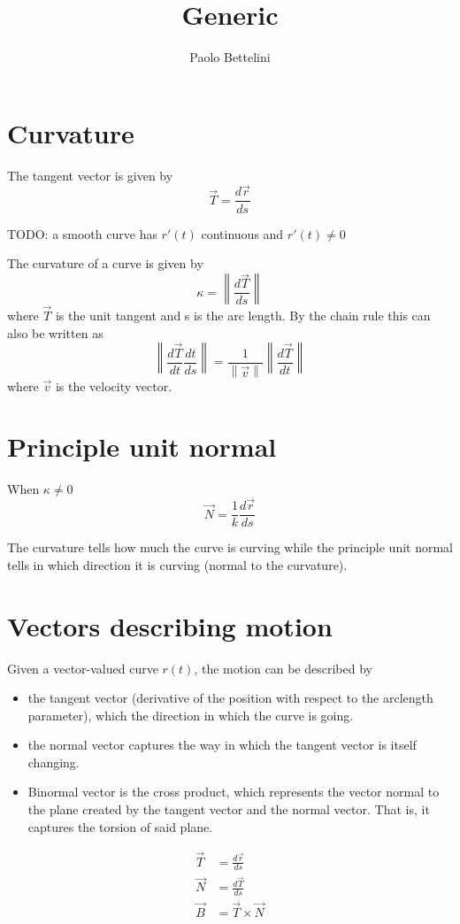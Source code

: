\documentclass[a4paper]{article}
\title{Generic}
\author{Paolo Bettelini}
\date{}
\begin{document}
\section{Curvature}

The tangent vector is given by
\[
    \vec{T} = \frac{d\vec{r}}{ds}
\]

TODO: a smooth curve has \(r'(t)\) continuous and \(r'(t) \neq 0\)

\newcommand\norm[1]{\left\lVert#1\right\rVert}
The curvature of a curve is given by
\[
    \kappa = \norm{\frac{d\vec{T}}{ds}}
\]
where \(\vec{T}\) is the unit tangent and s is the arc length.
By the chain rule this can also be written as
\[
    \norm{\frac{d\vec{T}}{dt}\frac{dt}{ds}} = \frac{1}{\norm{\vec{v}}}\norm{\frac{d\vec{T}}{dt}}
\]
where \(\vec{v}\) is the velocity vector.


\section{Principle unit normal}

When \(\kappa \neq 0\)
\[
    \vec{N} = \frac{1}{k}\frac{d\vec{r}}{ds}
\]

The curvature tells how much the curve is curving while the principle
unit normal tells in which direction it is curving (normal to the curvature).

\section{Vectors describing motion}

Given a vector-valued curve \(r(t)\), the motion can be described by
\begin{itemize}
    \item the tangent vector (derivative of the position
        with respect to the arclength parameter), which the direction in which the curve is going.
    \item the normal vector captures the way in which the tangent vector is itself changing.
    \item Binormal vector is the cross product, which represents the vector normal to the plane
        created by the tangent vector and the normal vector. That is, it captures the torsion of said plane.
\end{itemize}

\begin{align*}
    \vec{T} &= \frac{d\vec{r}}{ds} \\
    \vec{N} &= \frac{d\vec{T}}{ds} \\
    \vec{B} &= \vec{T} \times \vec{N}
\end{align*}
\end{document}
